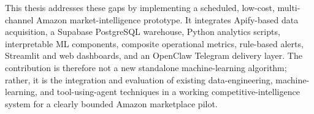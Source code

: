 This thesis addresses these gaps by implementing a scheduled, low-cost,
multi-channel Amazon market-intelligence prototype. It integrates
Apify-based data acquisition, a Supabase PostgreSQL warehouse, Python
analytics scripts, interpretable ML components, composite operational
metrics, rule-based alerts, Streamlit and web dashboards, and an
OpenClaw Telegram delivery layer. The contribution is therefore not a
new standalone machine-learning algorithm; rather, it is the integration
and evaluation of existing data-engineering, machine-learning, and
tool-using-agent techniques in a working competitive-intelligence system
for a clearly bounded Amazon marketplace pilot.

